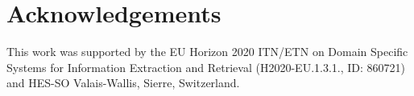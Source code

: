 \documentclass[11pt]{article}
\begin{document}

\section*{Acknowledgements}
\label{acknowledgements}
%
This work was supported by the EU Horizon 2020 ITN/ETN on Domain Specific Systems for Information Extraction and Retrieval (H2020-EU.1.3.1., ID: 860721) and HES-SO Valais-Wallis, Sierre, Switzerland.
%
%
%





\end{document}
